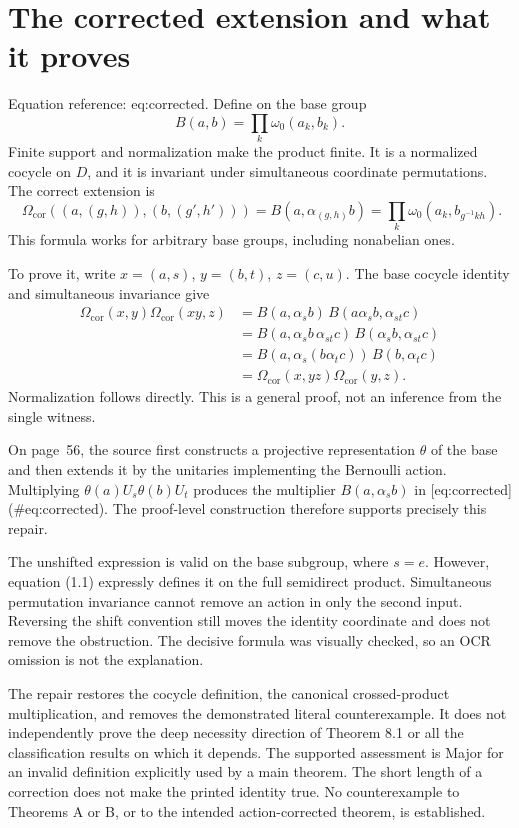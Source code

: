 \documentclass[10pt]{article}
\begin{document}
\section*{The corrected extension and what it proves}
Equation reference: eq:corrected. Define on the base group \[B(a,b)=\prod_k\omega_0(a_k,b_k).\] Finite support and normalization make the product finite. It is a normalized cocycle on \(D\), and it is invariant under simultaneous coordinate permutations. The correct extension is \[
 \boxed{\quad
 \Omega_{\mathrm{cor}}((a,(g,h)),(b,(g',h')))
 =B(a,\alpha_{(g,h)}b)
 =\prod_k\omega_0(a_k,b_{g^{-1}kh}).
 \quad}\] This formula works for arbitrary base groups, including nonabelian ones.\par
To prove it, write \(x=(a,s)\), \(y=(b,t)\), \(z=(c,u)\). The base cocycle identity and simultaneous invariance give \[\begin{aligned}
 \Omega_{\mathrm{cor}}(x,y)\Omega_{\mathrm{cor}}(xy,z)
 &=B(a,\alpha_s b)\,B(a\alpha_s b,\alpha_{st}c)\\
 &=B(a,\alpha_s b\,\alpha_{st}c)\,B(\alpha_s b,\alpha_{st}c)\\
 &=B(a,\alpha_s(b\alpha_t c))\,B(b,\alpha_t c)\\
 &=\Omega_{\mathrm{cor}}(x,yz)\Omega_{\mathrm{cor}}(y,z).\end{aligned}\] Normalization follows directly. This is a general proof, not an inference from the single witness.\par
On page 56, the source first constructs a projective representation \(\theta\) of the base and then extends it by the unitaries implementing the Bernoulli action. Multiplying \(\theta(a)U_s\theta(b)U_t\) produces the multiplier \(B(a,\alpha_s b)\) in [eq:corrected] (\#eq:corrected). The proof-level construction therefore supports precisely this repair.\par
The unshifted expression is valid on the base subgroup, where \(s=e\). However, equation (1.1) expressly defines it on the full semidirect product. Simultaneous permutation invariance cannot remove an action in only the second input. Reversing the shift convention still moves the identity coordinate and does not remove the obstruction. The decisive formula was visually checked, so an OCR omission is not the explanation.\par
The repair restores the cocycle definition, the canonical crossed-product multiplication, and removes the demonstrated literal counterexample. It does not independently prove the deep necessity direction of Theorem 8.1 or all the classification results on which it depends. The supported assessment is Major for an invalid definition explicitly used by a main theorem. The short length of a correction does not make the printed identity true. No counterexample to Theorems A or B, or to the intended action-corrected theorem, is established.\par
\end{document}
